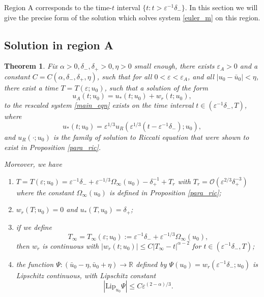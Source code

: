 \documentclass[letterpaper,11pt]{article}
\newcommand{\rmO}{\mathcal{O}}
\newcommand{\eps}{\varepsilon}
\numberwithin{equation}{section}
\theoremstyle{plain}
\newtheorem{theorem}{Theorem}[section]
\begin{document}
Region A corresponds to the time-$t$ interval $\{ t : t > \eps^{-1}\delta_-\}$. In this section we will give the precise form of the solution which solves system \eqref{euler_m} on this region.

\subsection{Solution in region A}

\begin{theorem}\label{thm:r}
Fix $\alpha>0, \delta_-,\delta_+>0, \eta>0$ small enough, there exists $\eps_A>0$ and a constant $C=C(\alpha,\delta_-,\delta_+,\eta)$, such that for all $0<\eps <\eps_A$, and all $|u_0 - \bar{u}_0|<\eta$, there exist a time $T=T(\eps;u_0)$, such that a solution of the form
\begin{equation}
u_A(t;u_0) = u_*(t; u_0) + w_r(t; u_0),
\end{equation}
to the rescaled system \eqref{main_eqn} exists on the time interval $t \in (\eps^{-1}\delta_-, T)$,
where
\begin{equation}
u_*(t; u_0) = \eps^{1/3}u_R(\eps^{1/3}(t-\eps^{-1}\delta_-); u_0),
\end{equation} and $u_R(\cdot; u_0)$ is the family of solution to Riccati equation that were shown to exist in Proposition \ref{para_ric}. 

Moreover, we have
\begin{enumerate}[label=\textnormal{(\arabic*)}]
\item \label{thm:r_1}$T=T(\eps;u_0) = \eps^{-1}\delta_-+\eps^{-1/3}\Omega_\infty(u_0)-\delta_+^{-1}+T_r$ with $T_r = \rmO( \eps^{2/3}\delta_+^{-3} )$ where the constant $\Omega_\infty(u_0)$ is defined in Proposition \ref{para_ric};
\item \label{thm:r_2} $w_r(T; u_0) = 0$ and $u_*(T,u_0)=\delta_+$;

\item \label{thm:r_3} if we define  
\begin{equation}\label{def:T_inf}
T_\infty = T_\infty(\eps; u_0) := \eps^{-1}\delta_- + \eps^{-1/3}\Omega_\infty(u_0),
\end{equation}
then $w_r$ is continuous with $|w_r(t; u_0)| \le C|T_\infty-t|^{\alpha-2}$ for $t \in (\eps^{-1}\delta_-, T)$;

\item \label{thm:r_4} the function 
$\Psi: (\bar{u}_0-\eta, \bar{u}_0+\eta) \to \mathbb{R}$ defined by $\Psi(u_0)=  w_r(\eps^{-1}\delta_-; u_0)$ is Lipschitz continuous, with Lipschitz constant 
\[
|\text{Lip}_{u_0}\Psi |\le C\eps^{(2-\alpha)/3}. 
\]
\end{enumerate}
\end{theorem}
\end{document}

